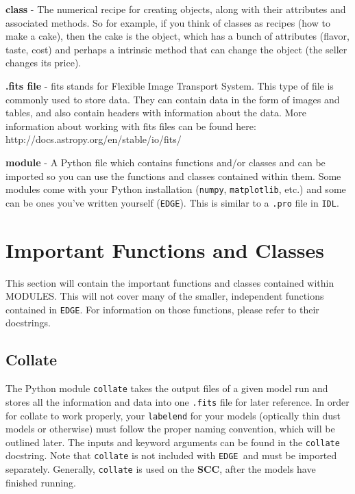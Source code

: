 \documentclass{article}
\newcommand{\edge}{\texttt{EDGE }}
\begin{document}
\noindent \textbf{class} - The numerical recipe for creating objects, along with their attributes and associated methods. So for example, if you think of classes as recipes (how to make a cake), then the cake is the object, which has a bunch of attributes (flavor, taste, cost) and perhaps a intrinsic method that can change the object (the seller changes its price).
 \vspace{2mm}

 \noindent \textbf{.fits file} - fits stands for Flexible Image Transport System. This type of file is commonly used to store data. They can contain data in the form of images and tables, and also contain headers with information about the data. More information about working with fits files can be found here: http://docs.astropy.org/en/stable/io/fits/
 \vspace{2mm}
 
\noindent \textbf{module} - A Python file which contains functions and/or classes and can be imported so you can use the functions and classes contained within them. Some modules come with your Python installation (\texttt{numpy}, \texttt{matplotlib}, etc.) and some can be ones you’ve written yourself (\texttt{EDGE}). This is similar to a \texttt{.pro} file in \texttt{IDL}. 
 

 
\section{Important Functions and Classes} \label{functions}

\noindent This section will contain the important functions and classes contained within MODULES. This will not cover many of the smaller, independent functions contained in \texttt{EDGE}. For information on those functions, please refer to their docstrings. 
 
\subsection{Collate}
 
\noindent The Python module \texttt{collate} takes the output files of a given model run and stores all the information and data into one \texttt{.fits} file for later reference. In order for collate to work properly, your \texttt{labelend} for your models (optically thin dust models or otherwise) must follow the proper naming convention, which will be outlined later. The inputs and keyword arguments can be found in the \texttt{collate} docstring. Note that \texttt{collate} is not included with \edge and must be imported separately. 
Generally, \texttt{collate} is used on the \textbf{SCC}, after the models have finished running. 
\end{document}
